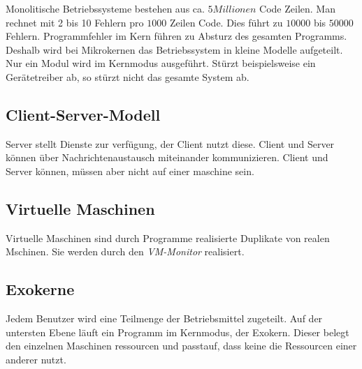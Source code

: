 Monolitische Betriebssysteme bestehen aus ca. $5 Millionen$ Code Zeilen. Man
rechnet mit 2 bis 10 Fehlern pro $1000$ Zeilen Code. Dies führt zu $10000$ bis
$50000$ Fehlern. Programmfehler im Kern führen zu Absturz des gesamten
Programms. Deshalb wird bei Mikrokernen das Betriebssystem in kleine Modelle
aufgeteilt. Nur ein Modul wird im Kernmodus ausgeführt. Stürzt beispielsweise
ein Gerätetreiber ab, so stürzt nicht das gesamte System ab.

\subsection{Client-Server-Modell}

Server stellt Dienste zur verfügung, der Client nutzt diese. Client und Server
können über Nachrichtenaustausch miteinander kommunizieren. Client und Server
können, müssen aber nicht auf einer maschine sein.

\subsection{Virtuelle Maschinen}
\label{virtuelle_maschine}

Virtuelle Maschinen sind durch Programme realisierte Duplikate von realen
Mschinen. Sie werden durch den \textit{VM-Monitor} realisiert.

\subsection{Exokerne}

Jedem Benutzer wird eine Teilmenge der Betriebsmittel zugeteilt. Auf der
untersten Ebene läuft ein Programm im Kernmodus, der Exokern. Dieser belegt den
einzelnen Maschinen ressourcen und passtauf, dass keine
 die Ressourcen einer anderer nutzt.